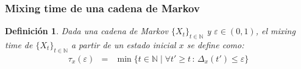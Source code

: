 \documentclass{beamer}
\newtheorem{definicion}{Definición}
\newcommand{\vs}[1]{\vspace{#1mm}}
\begin{document}
	\begin{frame}
		\frametitle{Mixing time de una cadena de Markov}
		
		{\small
			
			\begin{definicion}
				Dada una cadena  de Markov $\{ X_t \}_{t \in \mathbb{N}}$ y $\varepsilon \in (0,1)$, el mixing time de $\{ X_t \}_{t \in \mathbb{N}}$ a partir de un estado inicial $x$ se define como:
				\begin{eqnarray*}
					\tau_x(\varepsilon) & = & \min\{t \in \mathbb{N} \mid \forall t' \geq t \,:\, \Delta_x(t') \leq \varepsilon\}
				\end{eqnarray*}
			\end{definicion}
			
			\vs{8}
			
			
		}
		
	\end{frame}
	
\end{document}
